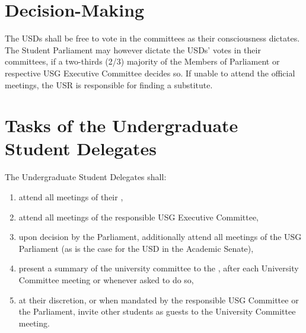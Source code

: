 \section{Decision-Making}
The USDs shall be free to vote in the  committees as their consciousness dictates. The Student Parliament may however dictate the USDs' votes in their  committees, if a two-thirds (2/3) majority of the Members of Parliament or respective USG Executive Committee decides so. If unable to attend the official meetings, the USR is responsible for finding a substitute.

\section{Tasks of the Undergraduate Student Delegates}
The Undergraduate Student Delegates shall:
\begin{enumerate}
    \item attend all meetings of their ,
    \item attend all meetings of the responsible USG Executive Committee,
    \item upon decision by the Parliament, additionally attend all meetings of the USG Parliament (as is the case for the USD in the Academic Senate),
    \item present a summary of the university committee to the , after each University Committee meeting or whenever asked to do so,
    \item at their discretion, or when mandated by the responsible USG Committee or the Parliament, invite other students as guests to the University Committee meeting.
\end{enumerate}
